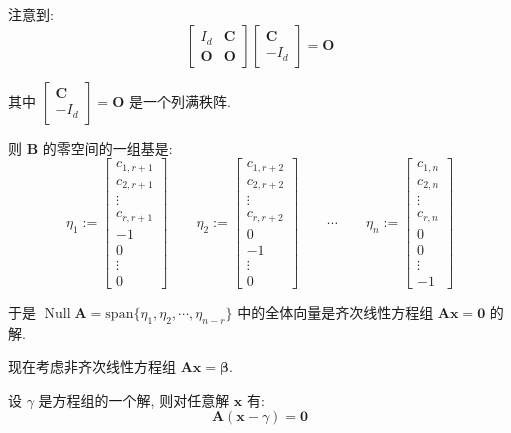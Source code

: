 \documentclass[UTF8]{ctexart}
\DeclareMathOperator{\0}{\mathbf{0}}
\DeclareMathOperator{\Null}{Null}
\DeclareMathOperator{\<}{\langle}
\renewcommand{\>}{\rangle}
\begin{document}
		注意到: 
		\[\begin{bmatrix}
			I_d & \mathbf{C}\\
			\mathbf{O} & \mathbf{O}
		\end{bmatrix}
		\begin{bmatrix}
			\mathbf{C}\\
			-I_d
		\end{bmatrix}=\mathbf{O}\]

		其中 \(\begin{bmatrix}
			\mathbf{C}\\
			-I_d
		\end{bmatrix}=\mathbf{O}\) 是一个列满秩阵. 

		则 \(\bm{B}\) 的零空间的一组基是: 
		\[\eta_1:=
		\begin{bmatrix}
			c_{1,r+1}\\
			c_{2,r+1}\\
			\vdots\\
			c_{r,r+1}\\
			-1\\
			0\\
			\vdots\\
			0
		\end{bmatrix}
		\qquad
		\eta_2:=
		\begin{bmatrix}
			c_{1,r+2}\\
			c_{2,r+2}\\
			\vdots\\
			c_{r,r+2}\\
			0\\
			-1\\
			\vdots\\
			0
		\end{bmatrix}
		\qquad
		\cdots
		\qquad
		\eta_n:=
		\begin{bmatrix}
			c_{1,n}\\
			c_{2,n}\\
			\vdots\\
			c_{r,n}\\
			0\\
			0\\
			\vdots\\
			-1
		\end{bmatrix}\]

		于是 \(\Null\bm{A}=\mathrm{span}\{\eta_1,\eta_2,\cdots,\eta_{n-r}\}\) 中的全体向量是齐次线性方程组 \(\bm{A}\bm{x}=\mathbf{0}\) 的解. 

		现在考虑非齐次线性方程组 \(\bm{A}\bm{x}=\bm\beta\). 

		设 \(\gamma\) 是方程组的一个解, 则对任意解 \(\bm{x}\) 有: 
		\[\bm{A}(\bm{x}-\gamma)=\mathbf{0}\]
\end{document}
